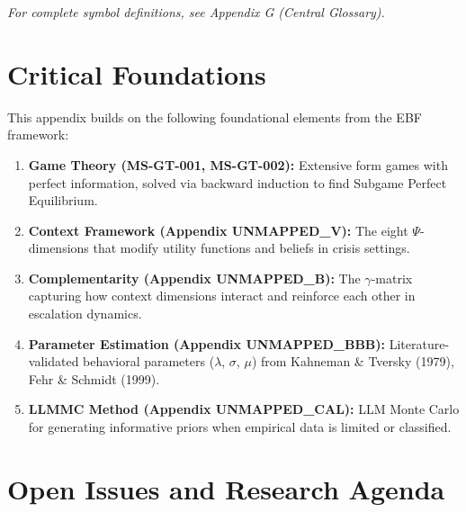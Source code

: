 \vspace{5mm}
\textit{For complete symbol definitions, see Appendix G (Central Glossary).}



\section{Critical Foundations}
\label{sec:crisis-foundations}

This appendix builds on the following foundational elements from the EBF framework:

\begin{enumerate}
\item \textbf{Game Theory (MS-GT-001, MS-GT-002):} Extensive form games with perfect information, solved via backward induction to find Subgame Perfect Equilibrium.

\item \textbf{Context Framework (Appendix UNMAPPED_V):} The eight $\Psi$-dimensions that modify utility functions and beliefs in crisis settings.

\item \textbf{Complementarity (Appendix UNMAPPED_B):} The $\gamma$-matrix capturing how context dimensions interact and reinforce each other in escalation dynamics.

\item \textbf{Parameter Estimation (Appendix UNMAPPED_BBB):} Literature-validated behavioral parameters ($\lambda$, $\sigma$, $\mu$) from Kahneman \& Tversky (1979), Fehr \& Schmidt (1999).

\item \textbf{LLMMC Method (Appendix UNMAPPED_CAL):} LLM Monte Carlo for generating informative priors when empirical data is limited or classified.
\end{enumerate}



\section{Open Issues and Research Agenda}
\label{sec:crisis-open}

